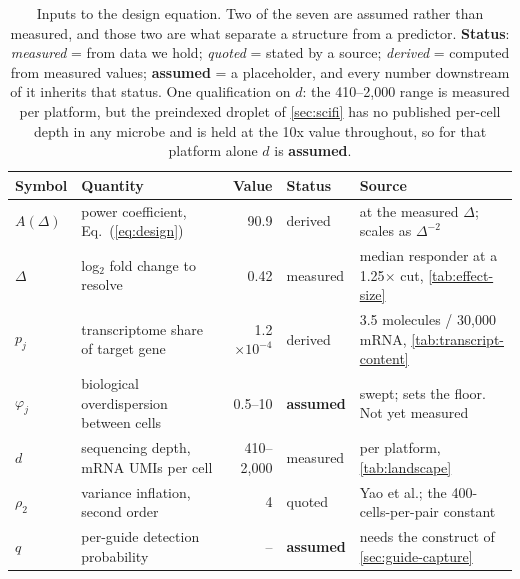 \begin{table}[htbp]\centering
\footnotesize
\caption[]{Inputs to the design equation. Two of the seven are assumed rather than measured, and those two are what separate a structure from a predictor. \textbf{Status}: \emph{measured} = from data we hold; \emph{quoted} = stated by a source; \emph{derived} = computed from measured values; \textbf{assumed} = a placeholder, and every number downstream of it inherits that status. One qualification on $d$: the 410--2{,}000 range is measured per platform, but the preindexed droplet of \cref{sec:scifi} has no published per-cell depth in any microbe and is held at the 10x value throughout, so for that platform alone $d$ is \textbf{assumed}.}\label{tab:design-params}
\begin{tabular}{llrll}
\toprule
Symbol & Quantity & Value & Status & Source \\
\midrule
$A(\Delta)$ & power coefficient, Eq.~(\ref{eq:design}) & 90.9 & derived & at the measured $\Delta$; scales as $\Delta^{-2}$ \\
$\Delta$ & log$_2$ fold change to resolve & 0.42 & measured & median responder at a 1.25$\times$ cut, \cref{tab:effect-size} \\
$p_j$ & transcriptome share of target gene & 1.2$\times10^{-4}$ & derived & 3.5 molecules / 30{,}000 mRNA, \cref{tab:transcript-content} \\
$\varphi_j$ & biological overdispersion between cells & 0.5--10 & \textbf{assumed} & swept; sets the floor. Not yet measured \\
$d$ & sequencing depth, mRNA UMIs per cell & 410--2{,}000 & measured & per platform, \cref{tab:landscape} \\
$\rho_2$ & variance inflation, second order & 4 & quoted & Yao et al.; the 400-cells-per-pair constant \\
$q$ & per-guide detection probability & -- & \textbf{assumed} & needs the construct of \cref{sec:guide-capture} \\
\bottomrule
\end{tabular}
\end{table}
